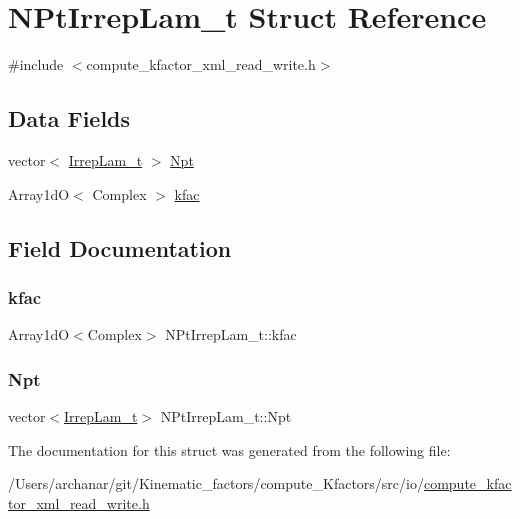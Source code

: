 \hypertarget{structNPtIrrepLam__t}{}\section{N\+Pt\+Irrep\+Lam\+\_\+t Struct Reference}
\label{structNPtIrrepLam__t}


{\ttfamily \#include $<$compute\+\_\+kfactor\+\_\+xml\+\_\+read\+\_\+write.\+h$>$}

\subsection*{Data Fields}
\begin{DoxyCompactItemize}
\item 
vector$<$ \mbox{\hyperlink{structIrrepLam__t}{Irrep\+Lam\+\_\+t}} $>$ \mbox{\hyperlink{structNPtIrrepLam__t_a31ad6a6e9eb2df27cfce27ef0a13657f}{Npt}}
\item 
Array1dO$<$ Complex $>$ \mbox{\hyperlink{structNPtIrrepLam__t_ad2772249c13c09632b889e3918baeaa8}{kfac}}
\end{DoxyCompactItemize}


\subsection{Field Documentation}
\mbox{\label{structNPtIrrepLam__t_ad2772249c13c09632b889e3918baeaa8}} 
\subsubsection{\texorpdfstring{kfac}{kfac}}
{\footnotesize\ttfamily Array1dO$<$Complex$>$ N\+Pt\+Irrep\+Lam\+\_\+t\+::kfac}

\mbox{\label{structNPtIrrepLam__t_a31ad6a6e9eb2df27cfce27ef0a13657f}} 
\subsubsection{\texorpdfstring{Npt}{Npt}}
{\footnotesize\ttfamily vector$<$\mbox{\hyperlink{structIrrepLam__t}{Irrep\+Lam\+\_\+t}}$>$ N\+Pt\+Irrep\+Lam\+\_\+t\+::\+Npt}



The documentation for this struct was generated from the following file\+:\begin{DoxyCompactItemize}
\item 
/\+Users/archanar/git/\+Kinematic\+\_\+factors/compute\+\_\+\+Kfactors/src/io/\mbox{\hyperlink{compute__kfactor__xml__read__write_8h}{compute\+\_\+kfactor\+\_\+xml\+\_\+read\+\_\+write.\+h}}\end{DoxyCompactItemize}
